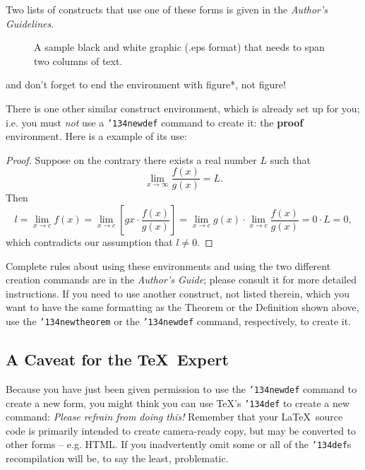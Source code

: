 \documentclass{acm_proc_article-sp}
\begin{document}
Two lists of constructs that use one of these
forms is given in the
\textit{Author's  Guidelines}.

\begin{figure*}
\centering
\caption{A sample black and white graphic (.eps format)
that needs to span two columns of text.}
\end{figure*}
and don't forget to end the environment with
{figure*}, not {figure}!
 
There is one other similar construct environment, which is
already set up
for you; i.e. you must \textit{not} use
a \texttt{{\char'134}newdef} command to
create it: the \textbf{proof} environment.  Here
is a example of its use:
\begin{proof}
Suppose on the contrary there exists a real number $L$ such that
\begin{displaymath}
\lim_{x\rightarrow\infty} \frac{f(x)}{g(x)} = L.
\end{displaymath}
Then
\begin{displaymath}
l=\lim_{x\rightarrow c} f(x)
= \lim_{x\rightarrow c}
\left[ g{x} \cdot \frac{f(x)}{g(x)} \right ]
= \lim_{x\rightarrow c} g(x) \cdot \lim_{x\rightarrow c}
\frac{f(x)}{g(x)} = 0\cdot L = 0,
\end{displaymath}
which contradicts our assumption that $l\neq 0$.
\end{proof}

Complete rules about using these environments and using the
two different creation commands are in the
\textit{Author's Guide}; please consult it for more
detailed instructions.  If you need to use another construct,
not listed therein, which you want to have the same
formatting as the Theorem
or the Definition\cite{salas:calculus} shown above,
use the \texttt{{\char'134}newtheorem} or the
\texttt{{\char'134}newdef} command,
respectively, to create it.

\subsection*{A {\secit Caveat} for the \TeX\ Expert}
Because you have just been given permission to
use the \texttt{{\char'134}newdef} command to create a
new form, you might think you can
use \TeX's \texttt{{\char'134}def} to create a
new command: \textit{Please refrain from doing this!}
Remember that your \LaTeX\ source code is primarily intended
to create camera-ready copy, but may be converted
to other forms -- e.g. HTML. If you inadvertently omit
some or all of the \texttt{{\char'134}def}s recompilation will
be, to say the least, problematic.
\end{document}

